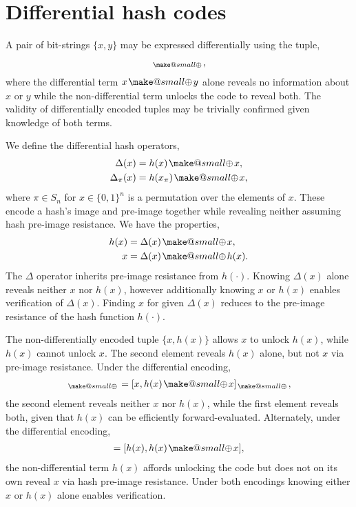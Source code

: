 \documentclass[twocolumn, aps, amsmath, amssymb, nofootinbib, superscriptaddress, longbibliography, doublefloatfix, table-of-contents, eqsecnum, rmp]{revtex4-2}
\makeatletter
\newcommand{\soplus}{{{\hspace{1pt}}{\mathbin{\mathpalette\make@small{\mathbin\oplus}}}}{\hspace{1pt}}}
\newcommand{\make@small}[2]{%
  \vcenter{\hbox{%
    \scalebox{0.6}{$\m@th#1#2$}%
  }}%
}
\makeatother
\begin{document}
\section{Differential hash codes}

A pair of bit-strings $\{x,y\}$ may be expressed differentially using the tuple,
\begin{align}
	[x,x\soplus y]_\soplus,
\end{align}
where the differential term $x\soplus y$ alone reveals no information about $x$ or $y$ while the non-differential term unlocks the code to reveal both. The validity of differentially encoded tuples may be trivially confirmed given knowledge of both terms.

We define the differential hash operators,
\begin{align}
	\Delta(x) &= h(x)\soplus x,\nonumber\\
	\Delta_\pi(x) &= h(x_\pi)\soplus x,
\end{align}
where $\pi\in S_n$ for $x\in\{0,1\}^n$ is a permutation over the elements of $x$. These encode a hash's image and pre-image together while revealing neither assuming hash pre-image resistance. We have the properties,
\begin{align}
	h(x) &= \Delta(x) \soplus x,\nonumber\\
	x &= \Delta(x) \soplus h(x).
\end{align}
The $\Delta$ operator inherits pre-image resistance from $h(\cdot)$. Knowing $\Delta(x)$ alone reveals neither $x$ nor $h(x)$, however additionally knowing $x$ or $h(x)$ enables verification of $\Delta(x)$. Finding $x$ for given $\Delta(x)$ reduces to the pre-image resistance of the hash function $h(\cdot)$.

The non-differentially encoded tuple $\{x,h(x)\}$ allows $x$ to unlock $h(x)$, while $h(x)$ cannot unlock $x$. The second element reveals $h(x)$ alone, but not $x$ via pre-image resistance. Under the differential encoding,
\begin{align}
	[x,\Delta(x)]_\soplus =[x,h(x)\soplus x]_\soplus,
\end{align}
the second element reveals neither $x$ nor $h(x)$, while the first element reveals both, given that $h(x)$ can be efficiently forward-evaluated. Alternately, under the differential encoding,
\begin{align}
	[h(x),\Delta(x)] = [h(x),h(x)\soplus x],
\end{align}
the non-differential term $h(x)$ affords unlocking the code but does not on its own reveal $x$ via hash pre-image resistance. Under both encodings knowing either $x$ or $h(x)$ alone enables verification.
\end{document}
